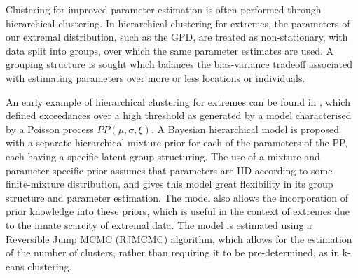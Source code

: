 \documentclass{article}
\numberwithin{equation}{section}
\begin{document}


Clustering for improved parameter estimation is often performed through hierarchical clustering.
In hierarchical clustering for extremes, the parameters of our extremal distribution, such as the GPD, are treated as non-stationary, with data split into groups, over which the same parameter estimates are used. 
A grouping structure is sought which balances the bias-variance tradeoff associated with estimating parameters over more or less locations or individuals.

An early example of hierarchical clustering for extremes can be found in \cite{Bottolo2003}, which defined exceedances over a high threshold as generated by a model characterised by a Poisson process $PP(\mu, \sigma, \xi)$.
A Bayesian hierarchical model is proposed with a separate hierarchical mixture prior for each of the parameters of the PP, each having a specific latent group structuring.
The use of a mixture and parameter-specific prior assumes that parameters are IID according to some finite-mixture distribution, and gives this model great flexibility in its group structure and parameter estimation. 
The model also allows the incorporation of prior knowledge into these priors, which is useful in the context of extremes due to the innate scarcity of extremal data.
The model is estimated using a Reversible Jump MCMC (RJMCMC) algorithm, which allows for the estimation of the number of clusters, rather than requiring it to be pre-determined, as in k-eans clustering. 
\end{document}
